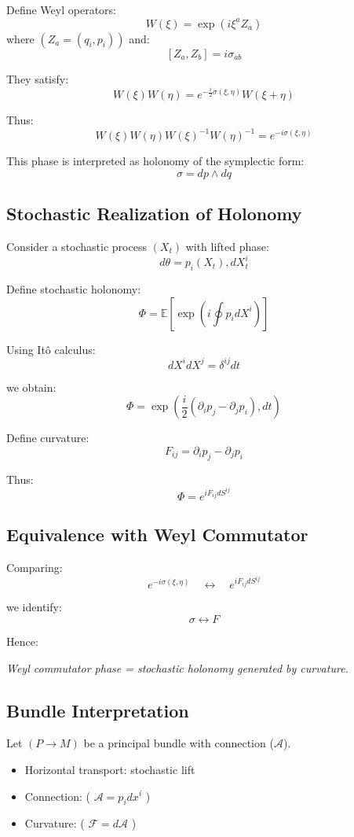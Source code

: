 \documentclass[11pt]{article}
\begin{document}
Define Weyl operators:
\[
W(\xi) = \exp\left(i \xi^a Z_a \right)
\]
where $(Z_a = (q_i, p_i))$ and:
\[
[Z_a, Z_b] = i \sigma_{ab}
\]

They satisfy:
\[
W(\xi) W(\eta) = e^{-\frac{i}{2} \sigma(\xi,\eta)} W(\xi+\eta)
\]

Thus:
\[
W(\xi)W(\eta)W(\xi)^{-1}W(\eta)^{-1}
= e^{-i\sigma(\xi,\eta)}
\]

This phase is interpreted as holonomy of the symplectic form:
\[
\sigma = dp \wedge dq
\]

\subsection{Stochastic Realization of Holonomy}

Consider a stochastic process $(X_t)$ with lifted phase:
\[
d\theta = p_i(X_t), dX^i_t
\]

Define stochastic holonomy:
\[
\Phi = \mathbb{E}\left [\exp\left(i \oint p_i dX^i \right)\right ]
\]

Using It\^o calculus:
\[
dX^i dX^j = \delta^{ij} dt
\]

we obtain:
\[
\Phi = \exp\left(
\frac{i}{2} (\partial_i p_j - \partial_j p_i), dt
\right)
\]

Define curvature:
\[
F_{ij} = \partial_i p_j - \partial_j p_i
\]

Thus:
\[
\Phi = e^{i F_{ij} dS^{ij}}
\]

\subsection{Equivalence with Weyl Commutator}

Comparing:
\[
e^{-i\sigma(\xi,\eta)} \quad \leftrightarrow \quad e^{i F_{ij} dS^{ij}}
\]

we identify:
\[
\sigma \longleftrightarrow F
\]

Hence:
\begin{center}
\emph{Weyl commutator phase = stochastic holonomy generated by curvature.}
\end{center}

\subsection{Bundle Interpretation}

Let $(P \to M)$ be a principal bundle with connection ($\mathcal{A}$).

\begin{itemize}
\item Horizontal transport: stochastic lift
\item Connection: ( $\mathcal{A} = p_i dx^i$ )
\item Curvature: ( $\mathcal{F} = d\mathcal{A}$ )
\end{itemize}
\end{document}
